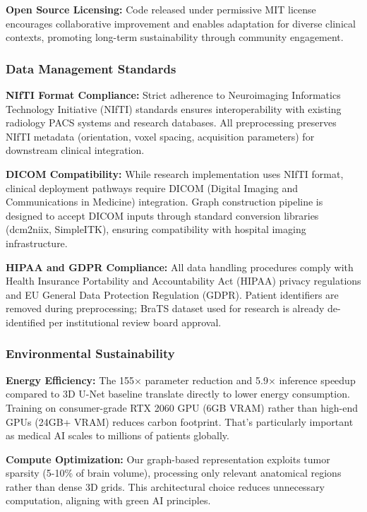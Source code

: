 \documentclass{article}
\begin{document}
\textbf{Open Source Licensing:} Code released under permissive MIT license encourages collaborative improvement and enables adaptation for diverse clinical contexts, promoting long-term sustainability through community engagement.

\subsubsection{Data Management Standards}

\textbf{NIfTI Format Compliance:} Strict adherence to Neuroimaging Informatics Technology Initiative (NIfTI) standards ensures interoperability with existing radiology PACS systems and research databases. All preprocessing preserves NIfTI metadata (orientation, voxel spacing, acquisition parameters) for downstream clinical integration.

\textbf{DICOM Compatibility:} While research implementation uses NIfTI format, clinical deployment pathways require DICOM (Digital Imaging and Communications in Medicine) integration. Graph construction pipeline is designed to accept DICOM inputs through standard conversion libraries (dcm2niix, SimpleITK), ensuring compatibility with hospital imaging infrastructure.

\textbf{HIPAA and GDPR Compliance:} All data handling procedures comply with Health Insurance Portability and Accountability Act (HIPAA) privacy regulations and EU General Data Protection Regulation (GDPR). Patient identifiers are removed during preprocessing; BraTS dataset used for research is already de-identified per institutional review board approval.

\subsubsection{Environmental Sustainability}

\textbf{Energy Efficiency:} The 155$\times$ parameter reduction and 5.9$\times$ inference speedup compared to 3D U-Net baseline translate directly to lower energy consumption. Training on consumer-grade RTX 2060 GPU (6GB VRAM) rather than high-end GPUs (24GB+ VRAM) reduces carbon footprint. That's particularly important as medical AI scales to millions of patients globally.

\textbf{Compute Optimization:} Our graph-based representation exploits tumor sparsity (5-10\% of brain volume), processing only relevant anatomical regions rather than dense 3D grids. This architectural choice reduces unnecessary computation, aligning with green AI principles.
\end{document}
